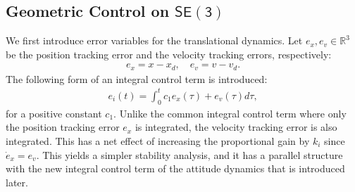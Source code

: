 \documentclass[twocolumn,letterpaper]{IEEEAerospaceCLS}  %
\newcommand{\refeqn}[1]{(\ref{eqn:#1})}
\newcommand{\SE}{\ensuremath{\mathsf{SE(3)}}}
\renewcommand{\Re}{\mathbb{R}}
\begin{document}
\subsection{Geometric Control on $\SE$}		


We first introduce error variables for the translational dynamics. Let $e_x,e_v\in{\Re}^3$ be the position tracking error and the velocity tracking errors, respectively:
\begin{align}
e_x = x-x_d,\quad e_v= v-v_d.\label{eqn:exev}
\end{align}
The following form of an integral control term is introduced:
\begin{align}
e_i(t) = \int_0^t c_1 e_x(\tau) + e_v(\tau) d\tau,\label{eqn:ei}
\end{align}
for a positive constant $c_1$. Unlike the common integral control term where only the position tracking error $e_x$ is integrated, the velocity tracking error is also integrated. This has a net effect of increasing the proportional gain by $k_i$ since $\dot e_x = e_v$.  This yields a simpler stability analysis, and it has a parallel structure with the new integral control term of the attitude dynamics that is introduced later. 
\end{document}
